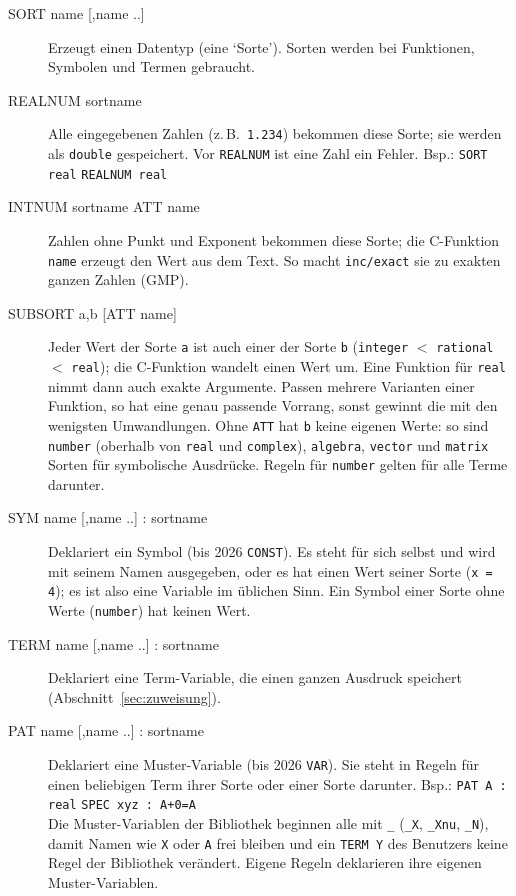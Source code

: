 \documentclass[a4paper,11pt]{article}
\newcommand{\kw}[1]{\texttt{#1}}
\begin{document}
\begin{description}
\item[SORT name {[},name ..{]}]
  Erzeugt einen Datentyp (eine `Sorte'). Sorten werden bei Funktionen,
  Symbolen und Termen gebraucht.

\item[REALNUM sortname]
  Alle eingegebenen Zahlen (z.\,B.\ \kw{1.234}) bekommen diese Sorte; sie
  werden als \kw{double} gespeichert. Vor \kw{REALNUM} ist eine Zahl ein
  Fehler. Bsp.: \kw{SORT real} \quad \kw{REALNUM real}

\item[INTNUM sortname ATT name]
  Zahlen ohne Punkt und Exponent bekommen diese Sorte; die C-Funktion
  \kw{name} erzeugt den Wert aus dem Text. So macht \kw{inc/exact} sie zu
  exakten ganzen Zahlen (GMP).

\item[SUBSORT a,b {[}ATT name{]}]
  Jeder Wert der Sorte \kw{a} ist auch einer der Sorte \kw{b}
  (\kw{integer} $<$ \kw{rational} $<$ \kw{real}); die C-Funktion wandelt
  einen Wert um. Eine Funktion für \kw{real} nimmt dann auch exakte
  Argumente. Passen mehrere Varianten einer Funktion, so hat eine genau
  passende Vorrang, sonst gewinnt die mit den wenigsten Umwandlungen.
  Ohne \kw{ATT} hat \kw{b} keine eigenen Werte: so sind \kw{number}
  (oberhalb von \kw{real} und \kw{complex}), \kw{algebra}, \kw{vector}
  und \kw{matrix} Sorten für symbolische Ausdrücke. Regeln für \kw{number}
  gelten für alle Terme darunter.

\item[SYM name {[},name ..{]} : sortname]
  Deklariert ein Symbol (bis 2026 \kw{CONST}). Es steht für sich selbst
  und wird mit seinem Namen ausgegeben, oder es hat einen Wert seiner
  Sorte (\kw{x = 4}); es ist also eine Variable im üblichen Sinn. Ein
  Symbol einer Sorte ohne Werte (\kw{number}) hat keinen Wert.

\item[TERM name {[},name ..{]} : sortname]
  Deklariert eine Term-Variable, die einen ganzen Ausdruck speichert
  (Abschnitt~\ref{sec:zuweisung}).

\item[PAT name {[},name ..{]} : sortname]
  Deklariert eine Muster-Variable (bis 2026 \kw{VAR}). Sie steht in Regeln
  für einen beliebigen Term ihrer Sorte oder einer Sorte darunter.
  Bsp.: \kw{PAT A : real} \quad \kw{SPEC xyz : A+0=A}\\
  Die Muster-Variablen der Bibliothek beginnen alle mit \kw{\_}
  (\kw{\_X}, \kw{\_Xnu}, \kw{\_N}), damit Namen wie \kw{X} oder \kw{A}
  frei bleiben und ein \kw{TERM Y} des Benutzers keine Regel der
  Bibliothek verändert. Eigene Regeln deklarieren ihre eigenen
  Muster-Variablen.


\end{description}
\end{document}
